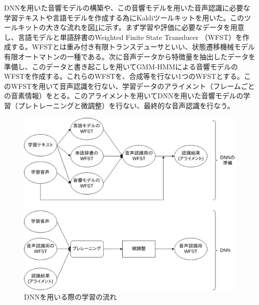 DNNを用いた音響モデルの構築や、この音響モデルを用いた音声認識に必要な学習テキストや言語モデルを作成する為にKaldiツールキット\cite{kaldi}を用いた。このツールキットの大きな流れを図\ref{fig:flow_train_dnn}に示す。まず学習や評価に必要なデータを用意し、言語モデルと単語辞書のWeighted Finite State Transducer （WFST）を作成する。WFSTとは重み付き有限トランスデューサといい、状態遷移機械モデル有限オートマトンの一種である。次に音声データから特徴量を抽出したデータを準備し、このデータと書き起こしを用いてGMM-HMMによる音響モデルのWFSTを作成する。これらのWFSTを、合成等を行ない1つのWFSTとする。このWFSTを用いて音声認識を行ない、学習データのアライメント（フレームごとの音素情報）をとる。このアライメントを用いてDNNを用いた音響モデルの学習（プレトレーニングと微調整）を行ない、最終的な音声認識を行なう。

\begin{figure}[H]
  \begin{center}
    \includegraphics[scale=0.5]{./figure/train_dnn.eps}
  \end{center}
  \caption{DNNを用いる際の学習の流れ \label{fig:flow_train_dnn}}
\end{figure}


